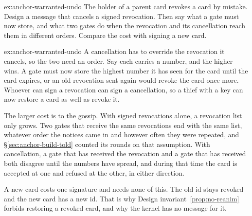 \documentclass[11pt,a4paper]{article}
\theoremstyle{definition}
\begin{document}
\begin{pdexercise}[kind=Open,rating=3]{ex:anchor-warranted-undo}
The holder of a parent card revokes a card by mistake. Design a message that cancels a signed revocation. Then say what a gate must now store, and what two gates do when the revocation and its cancellation reach them in different orders. Compare the cost with signing a new card.
\end{pdexercise}
\begin{pdsolution}{ex:anchor-warranted-undo}
A cancellation has to override the revocation it cancels, so the two need an order. Say each carries a number, and the higher wins. A gate must now store the highest number it has seen for the card until the card expires, or an old revocation sent again would revoke the card once more. Whoever can sign a revocation can sign a cancellation, so a thief with a key can now restore a card as well as revoke it.

The larger cost is to the gossip. With signed revocations alone, a revocation list only grows. Two gates that receive the same revocations end with the same list, whatever order the notices came in and however often they were repeated, and \S\ref{sec:anchor-build-told} counted its rounds on that assumption. With cancellation, a gate that has received the revocation and a gate that has received both disagree until the numbers have spread, and during that time the card is accepted at one and refused at the other, in either direction.

A new card costs one signature and needs none of this. The old id stays revoked and the new card has a new id. That is why Design invariant~\ref{prop:no-reanim} forbids restoring a revoked card, and why the kernel has no message for it.
\end{pdsolution}

\end{document}

